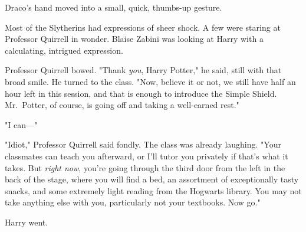 Draco's hand moved into a small, quick, thumbs-up gesture.

Most of the Slytherins had expressions of sheer shock. A few were staring at 
Professor Quirrell in wonder. Blaise Zabini was looking at Harry with a 
calculating, intrigued expression.

Professor Quirrell bowed. "Thank \emph{you}, Harry Potter," he said, still with 
that broad smile. He turned to the class. "Now, believe it or not, we still 
have half an hour left in this session, and that is enough to introduce the 
Simple Shield. Mr.~Potter, of course, is going off and taking a well-earned 
rest."

"I can---"

"Idiot," Professor Quirrell said fondly. The class was already laughing. "Your 
classmates can teach you afterward, or I'll tutor you privately if that's what 
it takes. But \emph{right now}, you're going through the third door from the 
left in the back of the stage, where you will find a bed, an assortment of 
exceptionally tasty snacks, and some extremely light reading from the Hogwarts 
library. You may not take anything else with you, particularly not your 
textbooks. Now go."

Harry went.